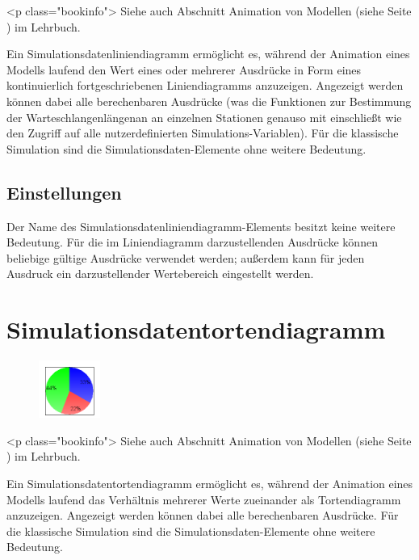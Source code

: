 <p class="bookinfo">
Siehe auch Abschnitt Animation von Modellen (siehe Seite \pageref{ref:book:5.4.3}) im Lehrbuch.

Ein Simulationsdatenliniendiagramm ermöglicht es, während der Animation eines Modells laufend den Wert
eines oder mehrerer Ausdrücke in Form eines kontinuierlich fortgeschriebenen Liniendiagramms anzuzeigen.
Angezeigt werden können dabei alle berechenbaren Ausdrücke (was die Funktionen zur Bestimmung der
Warteschlangenlängenan an einzelnen Stationen genauso mit einschließt wie den Zugriff auf alle
nutzerdefinierten Simulations-Variablen). Für die klassische Simulation sind die
Simulationsdaten-Elemente ohne weitere Bedeutung.

\subsection*{Einstellungen}

Der Name des Simulationsdatenliniendiagramm-Elements besitzt keine weitere Bedeutung. Für die im
Liniendiagramm darzustellenden Ausdrücke können beliebige gültige Ausdrücke verwendet werden;
außerdem kann für jeden Ausdruck ein darzustellender Wertebereich eingestellt werden.


\section{Simulationsdatentortendiagramm}
\label{ref:ModelElementAnimationPieChart}

\begin{figure}
\vspace{-22pt}
\includegraphics[width=2cm]{imageModelElementAnimationPieChart.png}
\vspace{-22pt}
\end{figure}

<p class="bookinfo">
Siehe auch Abschnitt Animation von Modellen (siehe Seite \pageref{ref:book:5.4.3}) im Lehrbuch.

Ein Simulationsdatentortendiagramm ermöglicht es, während der Animation eines Modells laufend 
das Verhältnis mehrerer Werte zueinander als Tortendiagramm anzuzeigen.
Angezeigt werden können dabei alle berechenbaren Ausdrücke. Für die klassische Simulation sind die
Simulationsdaten-Elemente ohne weitere Bedeutung.

